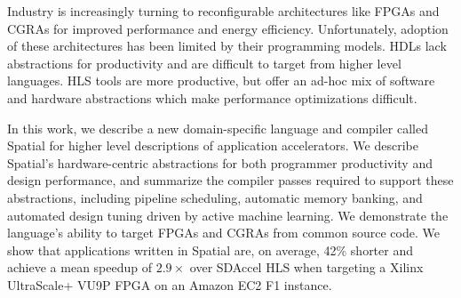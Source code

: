 Industry is increasingly turning to reconfigurable architectures like FPGAs and CGRAs for improved performance and energy
efficiency. 
Unfortunately, adoption of these architectures has been limited by their programming models. HDLs lack abstractions for productivity and are difficult to target from higher level languages. HLS tools are more productive, but offer an ad-hoc mix of software and hardware abstractions which make performance optimizations difficult. 

In this work, we describe a new domain-specific language and compiler called Spatial for higher level descriptions of application accelerators.
We describe Spatial's hardware-centric abstractions for both programmer productivity and design performance, and summarize the compiler passes required to support these abstractions, including pipeline scheduling, automatic memory banking, and automated design tuning driven by active machine learning.
We demonstrate the language's ability to target FPGAs and CGRAs from common source code. We show that applications written in Spatial
are, on average, 42\% shorter and achieve a mean speedup of $2.9\times$ over SDAccel HLS when targeting a Xilinx UltraScale+ VU9P FPGA on an Amazon EC2 F1 instance.
